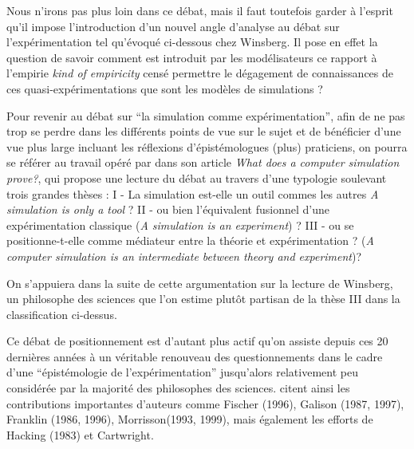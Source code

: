 Nous n'irons pas plus loin dans ce débat, mais il faut toutefois garder à l'esprit qu'il impose l'introduction \autocite{Phan2010, Varenne2013b} d'un nouvel angle d'analyse au débat sur l'expérimentation tel qu'évoqué ci-dessous chez Winsberg. Il pose en effet la question de savoir comment est introduit par les modélisateurs ce rapport à l'empirie \textit{kind of empiricity} censé permettre le dégagement de connaissances de ces quasi-expérimentations que sont les modèles de simulations \autocite{Phan2010} ?

Pour revenir au débat sur \enquote{la simulation comme expérimentation}, afin de ne pas trop se perdre dans les différents points de vue sur le sujet et de  bénéficier d'une vue plus large incluant les réflexions d'épistémologues (plus) praticiens, on pourra se référer au travail opéré par \textcite{Varenne2001} dans son article \textit{What does a computer simulation prove?}, qui propose une lecture du débat au travers d'une typologie soulevant trois grandes thèses : I - La simulation est-elle un outil commes les autres \textit{A simulation is only a tool} ? II - ou bien l'équivalent fusionnel d'une expérimentation classique (\textit{A simulation is an experiment}) ? III - ou se positionne-t-elle comme médiateur entre la théorie et expérimentation ? (\textit{A computer simulation is an intermediate between theory and experiment})?



On s'appuiera dans la suite de cette argumentation sur la lecture de Winsberg, un philosophe des sciences que l'on estime plutôt partisan de la thèse III dans la classification ci-dessus.

Ce débat de positionnement est d'autant plus actif qu'on assiste depuis ces 20 dernières années à un véritable renouveau des questionnements dans le cadre d'une \enquote{épistémologie de l'expérimentation} jusqu'alors relativement peu considérée par la majorité des philosophes des sciences. \textcites{Phan2008, Phan2010} citent ainsi les contributions importantes d'auteurs comme Fischer (1996), Galison (1987, 1997), Franklin (1986, 1996), Morrisson(1993, 1999), mais également les efforts de Hacking (1983) et Cartwright.

